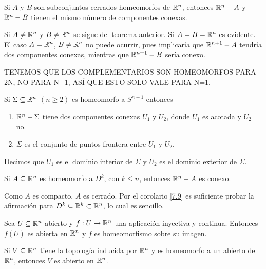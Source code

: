 \documentclass[CV.tex]{subfiles}
\begin{document}
\begin{coro}\label{7.9}
Si $A$ y $B$ son subconjuntos cerrados homeomorfos de $\mathbb{R}^n$, entonces $\mathbb{R}^n-A$ y $\mathbb{R}^n-B$ tienen el mismo número de componentes conexas. 
\end{coro}
\begin{dem}
Si $A\neq\mathbb{R}^n$ y $B\neq\mathbb{R}^n$ se sigue del teorema anterior. Si $A=B=\mathbb{R}^n$ es evidente. El caso $A=\mathbb{R}^n$, $B\neq\mathbb{R}^n$ no puede ocurrir, pues implicaría que $\mathbb{R}^{n+1}-A$ tendría dos componentes conexas, mientras que $\mathbb{R}^{n+1}-B$ sería conexo.\QED 

TENEMOS QUE LOS COMPLEMENTARIOS SON HOMEOMORFOS PARA 2N, NO PARA N+1, ASÍ QUE ESTO SOLO VALE PARA N=1. 
\end{dem}

\begin{teorema}
Si $\Sigma\subseteq\mathbb{R}^n$ $(n\geq 2)$ es homeomorfo a $S^{n-1}$ entonces
\begin{enumerate}
\item $\mathbb{R}^n-\Sigma$ tiene dos componentes conexas $U_1$ y $U_2$, donde $U_1$ es acotada y $U_2$ no.
\item $\Sigma$ es el conjunto de puntos frontera entre $U_1$ y $U_2$.
\end{enumerate}
Decimos que $U_1$ es el dominio interior de $\Sigma$ y $U_2$ es el dominio exterior de $\Sigma$.
\end{teorema}
\begin{dem}
\QED
\end{dem}

\begin{teorema}
Si $A\subseteq\mathbb{R}^n$ es homeomorfo a $D^k$, con $k\leq n$, entonces $\mathbb{R}^n-A$ es conexo.
\end{teorema}
\begin{dem}
Como $A$ es compacto, $A$ es cerrado. Por el corolario \ref{7.9} es suficiente probar la afirmación para $D^k\subseteq\mathbb{R}^k\subset\mathbb{R}^n$, lo cual es sencillo. \QED
\end{dem}

\begin{teorema}[de Brouwer] 
Sea $U\subseteq\mathbb{R}^n$ abierto y $f:U\to\mathbb{R}^n$ una aplicación inyectiva y continua. Entonces $f(U)$ es abierta en $\mathbb{R}^n$ y $f$ es homeomorfismo sobre su imagen. 
\end{teorema}
\begin{dem}
\QED
\end{dem}

\begin{coro}\label{7.13}
Si $V\subseteq\mathbb{R}^n$ tiene la topología inducida por $\mathbb{R}^n$ y es homeomorfo a un abierto de $\mathbb{R}^n$, entonces $V$ es abierto en $\mathbb{R}^n$.
\end{coro}
\end{document}
